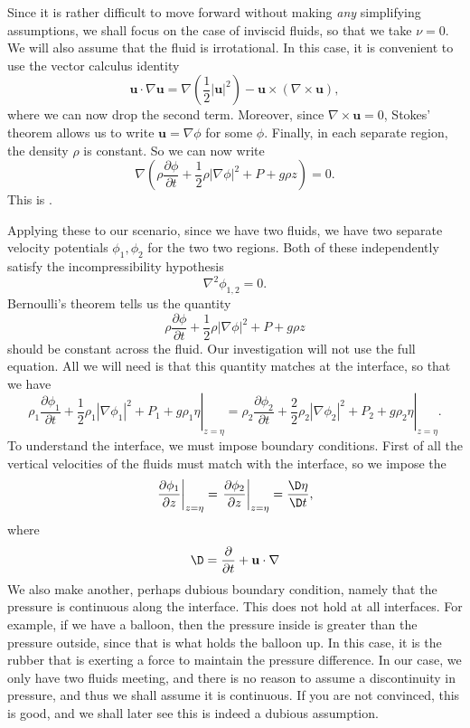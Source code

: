 \documentclass[a4paper]{article}
\begin{document}
Since it is rather difficult to move forward without making \emph{any} simplifying assumptions, we shall focus on the case of inviscid fluids, so that we take $\nu = 0$. We will also assume that the fluid is irrotational. In this case, it is convenient to use the vector calculus identity
\[
  \mathbf{u} \cdot \nabla \mathbf{u} = \nabla \left(\frac{1}{2}|\mathbf{u}|^2\right) - \mathbf{u} \times (\nabla \times \mathbf{u}),
\]
where we can now drop the second term. Moreover, since $\nabla \times \mathbf{u} = 0$, Stokes' theorem allows us to write $\mathbf{u} = \nabla \phi$ for some  $\phi$. Finally, in each separate region, the density $\rho$ is constant. So we can now write
\[
  \nabla \left(\rho \frac{\partial \phi}{\partial t} + \frac{1}{2} \rho |\nabla \phi|^2 + P + g \rho z\right) = 0.
\]
This is .

Applying these to our scenario, since we have two fluids, we have two separate velocity potentials $\phi_1, \phi_2$ for the two two regions. Both of these independently satisfy the incompressibility hypothesis
\[
  \nabla^2\phi_{1, 2} = 0.
\]
Bernoulli's theorem tells us the quantity
\[
  \rho \frac{\partial \phi}{\partial t} + \frac{1}{2} \rho |\nabla \phi|^2 + P + g \rho z
\]
should be constant across the fluid. Our investigation will not use the full equation. All we will need is that this quantity matches at the interface, so that we have
\[
  \left.\rho_1 \frac{\partial \phi_1}{\partial t} + \frac{1}{2} \rho_1 |\nabla \phi_1|^2 + P_1 + g \rho_1 \eta\right|_{z = \eta} = \left.\rho_2 \frac{\partial \phi_2}{\partial t} + \frac{2}{2} \rho_2 |\nabla \phi_2|^2 + P_2 + g \rho_2 \eta\right|_{z = \eta}.
\]
To understand the interface, we must impose boundary conditions. First of all the vertical velocities of the fluids must match with the interface, so we impose the 
\[
  \left.\frac{\partial \phi_1}{\partial z} \right|_{z = \eta} = \left.\frac{\partial \phi_2}{\partial z} \right|_{z = \eta} = \frac{\D \eta}{\D t},
\]
where
\[
  \D = \frac{\partial}{\partial t} + \mathbf{u} \cdot \nabla
\]
We also make another, perhaps dubious boundary condition, namely that the pressure is continuous along the interface. This does not hold at all interfaces. For example, if we have a balloon, then the pressure inside is greater than the pressure outside, since that is what holds the balloon up. In this case, it is the rubber that is exerting a force to maintain the pressure difference. In our case, we only have two fluids meeting, and there is no reason to assume a discontinuity in pressure, and thus we shall assume it is continuous. If you are not convinced, this is good, and we shall later see this is indeed a dubious assumption.
\end{document}
